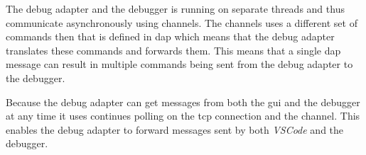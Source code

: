 The debug adapter and the debugger is running on separate threads and thus communicate asynchronously using channels.
The channels uses a different set of commands then that is defined in \acrshort{dap} which means that the debug adapter translates these commands and forwards them.
This means that a single \acrshort{dap} message can result in multiple commands being sent from the debug adapter to the debugger.


Because the debug adapter can get messages from both the \acrshort{gui} and the debugger at any time it uses continues polling on the \gls{tcp} connection and the channel.
This enables the debug adapter to forward messages sent by both \emph{VSCode} and the debugger.


